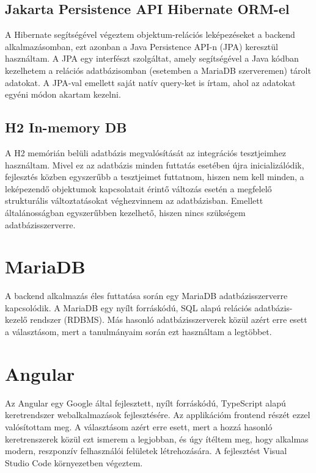 \documentclass[a4paper,12pt]{report}
\theoremstyle{definition}
\theoremstyle{remark}
\begin{document}
	\subsection{Jakarta Persistence API Hibernate ORM-el}

A Hibernate\cite{Hibernatewebsite} segítségével végeztem objektum-relációs leképezéseket a backend alkalmazásomban, ezt azonban a Java Persistence API-n (JPA)\cite{JPAwebsite} keresztül használtam. A JPA egy interfészt szolgáltat, amely segítségével a Java kódban kezelhetem a relációs adatbázisomban (esetemben a MariaDB szerveremen) tárolt adatokat. A JPA-val emellett saját natív query-ket is írtam, ahol az adatokat egyéni módon akartam kezelni.

	\subsection{H2 In-memory DB}

A H2\cite{H2website} memórián belüli adatbázis megvalósítását az integrációs tesztjeimhez használtam. Mivel ez az adatbázis minden futtatás esetében újra inicializálódik, fejlesztés közben egyszerűbb a tesztjeimet futtatnom, hiszen nem kell minden, a leképezendő objektumok kapcsolatait érintő változás esetén a megfelelő strukturális változtatásokat véghezvinnem az adatbázisban. Emellett általánosságban egyszerűbben kezelhető, hiszen nincs szükségem adatbázisszerverre.

\section{MariaDB}

A backend alkalmazás éles futtatása során egy MariaDB\cite{Mariawebsite} adatbázisszerverre kapcsolódik. A MariaDB egy nyílt forráskódú, SQL alapú relációs adatbázis-kezelő rendszer (RDBMS). Más hasonló adatbázisszerverek közül azért erre esett a választásom, mert a tanulmányaim során ezt használtam a legtöbbet.

\section{Angular}

Az Angular\cite{Angularwebsite} egy Google által fejlesztett, nyílt forráskódú, TypeScript alapú keretrendszer webalkalmazások fejlesztésére. Az applikációm frontend részét ezzel valósítottam meg. A választásom azért erre esett, mert a hozzá hasonló keretrenszerek közül ezt ismerem a legjobban, és úgy ítéltem meg, hogy alkalmas modern, reszponzív felhasználói felületek létrehozására. A fejlesztést Visual Studio Code\cite{VSCwebsite} környezetben végeztem.
\end{document}
